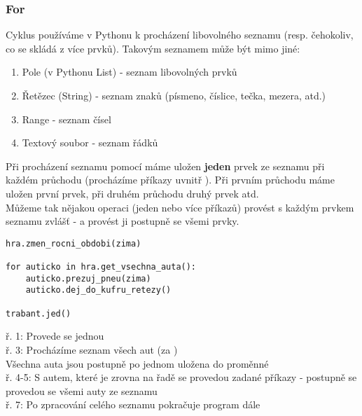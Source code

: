 \subsubsection{For}
Cyklus  používáme v Pythonu k procházení libovolného seznamu (resp. čehokoliv, co se skládá z více prvků). Takovým seznamem může být mimo jiné:
\begin{enumerate}
\item Pole (v Pythonu List) - seznam libovolných prvků
\item Řetězec (String) - seznam znaků (písmeno, číslice, tečka, mezera, atd.)
\item Range - seznam čísel
\item Textový soubor - seznam řádků
\end{enumerate}
Při procházení seznamu pomocí  máme uložen \textbf{jeden} prvek ze seznamu při každém průchodu (procházíme příkazy uvnitř ). Při prvním průchodu máme uložen první prvek, při druhém průchodu druhý prvek atd.\\
Můžeme tak nějakou operaci (jeden nebo více příkazů) provést s každým prvkem seznamu zvlášť - a provést ji postupně se všemi prvky.\\
\begin{minipage}[t]{.45\textwidth}
\begin{code}
\begin{verbatim}
hra.zmen_rocni_obdobi(zima)

for auticko in hra.get_vsechna_auta():
	auticko.prezuj_pneu(zima)
	auticko.dej_do_kufru_retezy()	

trabant.jed()
\end{verbatim}

\label{code:for}
\end{code}
\end{minipage}
\begin{minipage}[t]{.45\textwidth}
\vspace{1.5cm}
ř. 1:	Provede se jednou\\
ř. 3:	Procházíme seznam všech aut (za )\\
Všechna auta jsou postupně po jednom uložena do proměnné \\
ř. 4-5:	S autem, které je zrovna na řadě se provedou zadané příkazy - postupně se provedou se všemi auty ze seznamu\\
ř. 7:	Po zpracování celého seznamu pokračuje program dále
\end{minipage}\\

